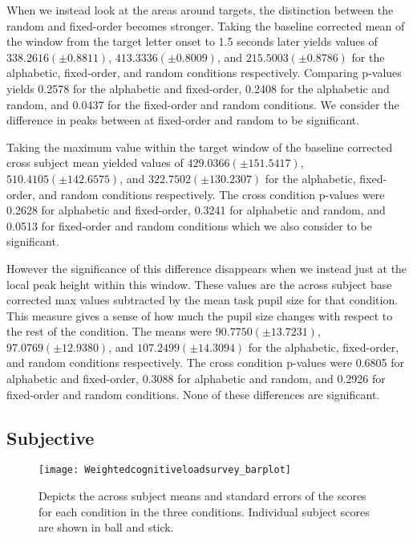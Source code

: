\documentclass[10pt]{article}
\begin{document}
When we instead look at the areas around targets, the distinction
between the random and fixed-order becomes stronger.  Taking
the baseline corrected mean of the window from the target letter
onset to 1.5 seconds later yields values of $338.2616 (\pm 0.8811)$,
$413.3336 (\pm 0.8009)$, and $215.5003 (\pm 0.8786)$ for the alphabetic,
fixed-order, and random conditions respectively.  Comparing p-values
yields 0.2578 for the alphabetic and fixed-order, 0.2408 for the
alphabetic and random, and 0.0437 for the fixed-order and random conditions.
We consider the difference in peaks between at fixed-order and
random to be significant.

Taking the maximum value within the target window of the baseline
corrected cross subject mean yielded  values of $429.0366 (\pm
151.5417)$, $510.4105 (\pm 142.6575)$, and $322.7502 (\pm 130.2307)$ for
the alphabetic, fixed-order, and random conditions respectively.
The cross condition p-values were 0.2628 for alphabetic and
fixed-order, 0.3241 for alphabetic and random, and 0.0513 for
fixed-order and random conditions which we also consider to be significant.

However the significance of this difference disappears when we
instead just at the local peak height within this window.  These
values are the across subject base corrected max values subtracted
by the mean task pupil size for that condition.  This measure gives
a sense of how much the pupil size changes with respect to the rest
of the condition. The means were $90.7750 (\pm 13.7231)$, $97.0769 (\pm
12.9380)$, and $107.2499 (\pm 14.3094)$ for the alphabetic,
fixed-order, and random conditions respectively.  The cross
condition p-values were 0.6805 for alphabetic and fixed-order,
0.3088 for alphabetic and random, and 0.2926 for fixed-order and
random conditions.  None of these differences are significant.


\subsection{Subjective}

\begin{figure}[t]
  \centering
  \texttt{[image: Weightedcognitiveloadsurvey\_barplot]}
  \caption{Depicts the across subject means and standard errors of
  the scores for each condition in the three conditions. Individual subject scores are shown in ball and stick.}
  \label{cogLoad}
\end{figure}
\end{document}
